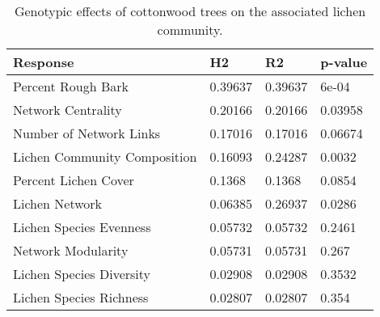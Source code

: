 \begin{table}[ht]
\centering
\begin{tabular}{llll}
  \hline
Response & H2 & R2 & p-value \\ 
  \hline
Percent Rough Bark & 0.39637 & 0.39637 & 6e-04 \\ 
  Network Centrality & 0.20166 & 0.20166 & 0.03958 \\ 
  Number of Network Links & 0.17016 & 0.17016 & 0.06674 \\ 
  Lichen Community Composition & 0.16093 & 0.24287 & 0.0032 \\ 
  Percent Lichen Cover & 0.1368 & 0.1368 & 0.0854 \\ 
  Lichen Network & 0.06385 & 0.26937 & 0.0286 \\ 
  Lichen Species Evenness & 0.05732 & 0.05732 & 0.2461 \\ 
  Network Modularity & 0.05731 & 0.05731 & 0.267 \\ 
  Lichen Species Diversity & 0.02908 & 0.02908 & 0.3532 \\ 
  Lichen Species Richness & 0.02807 & 0.02807 & 0.354 \\ 
   \hline
\end{tabular}
\caption{Genotypic effects of cottonwood trees on the associated lichen community.} 
\label{tab:h2_table}
\end{table}
